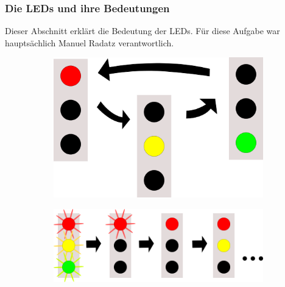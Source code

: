 \subsubsection{Die LEDs und ihre Bedeutungen}
\label{sec:leds}

Dieser Abschnitt erklärt die Bedeutung der LEDs.
Für diese Aufgabe war hauptsächlich Manuel Radatz verantwortlich.

\begin{figure}[h]
  \centering
  \begin{subfigure}[b]{0.22\textwidth}
    \includegraphics[width=\textwidth,keepaspectratio]
                    {./040-komponenten/010-hardware/led-default.png}
    \caption{\label{fig:led-init}}
  \end{subfigure}
  \hspace{0.1\textwidth}
  \begin{subfigure}[b]{0.40\textwidth}
    \includegraphics[width=\textwidth,keepaspectratio]{./040-komponenten/010-hardware/led-start.png}
    \caption{\label{fig:led-start}}
  \end{subfigure}
  

\end{figure}
